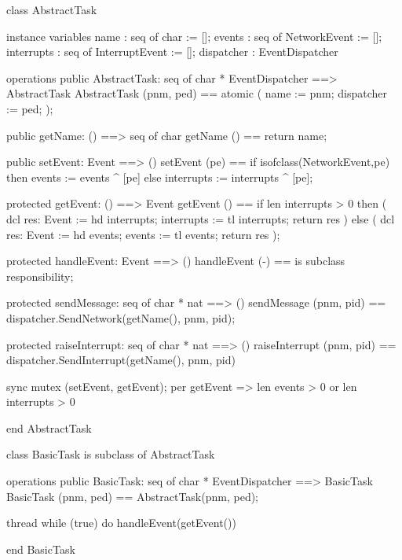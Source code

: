 \begin{vdm_al}
class AbstractTask

instance variables
  name : seq of char := [];
  events : seq of NetworkEvent := [];
  interrupts : seq of InterruptEvent := [];
  dispatcher : EventDispatcher

operations
  public AbstractTask: seq of char * EventDispatcher ==> AbstractTask
  AbstractTask (pnm, ped) == atomic ( name := pnm; dispatcher := ped; );

  public getName: () ==> seq of char
  getName () == return name;

  public setEvent: Event ==> ()
  setEvent (pe) == 
    if isofclass(NetworkEvent,pe)
    then events := events ^ [pe]
    else interrupts := interrupts ^ [pe];

  protected getEvent: () ==> Event
  getEvent () ==
    if len interrupts > 0
    then ( dcl res: Event := hd interrupts;
           interrupts := tl interrupts;
           return res )
    else ( dcl res: Event := hd events;
           events := tl events;
           return res );

  protected handleEvent: Event ==> ()
  handleEvent (-) == is subclass responsibility;

  protected sendMessage: seq of char * nat ==> ()
  sendMessage (pnm, pid) == dispatcher.SendNetwork(getName(), pnm, pid);

  protected raiseInterrupt: seq of char * nat ==> ()
  raiseInterrupt (pnm, pid) == dispatcher.SendInterrupt(getName(), pnm, pid)

sync
  mutex (setEvent, getEvent);
  per getEvent => len events > 0 or len interrupts > 0

end AbstractTask
\end{vdm_al}

\begin{vdm_al}
class BasicTask
  is subclass of AbstractTask

operations
  public BasicTask: seq of char * EventDispatcher ==> BasicTask
  BasicTask (pnm, ped) == AbstractTask(pnm, ped);

thread
  while (true) do
    handleEvent(getEvent())

end BasicTask
\end{vdm_al}

